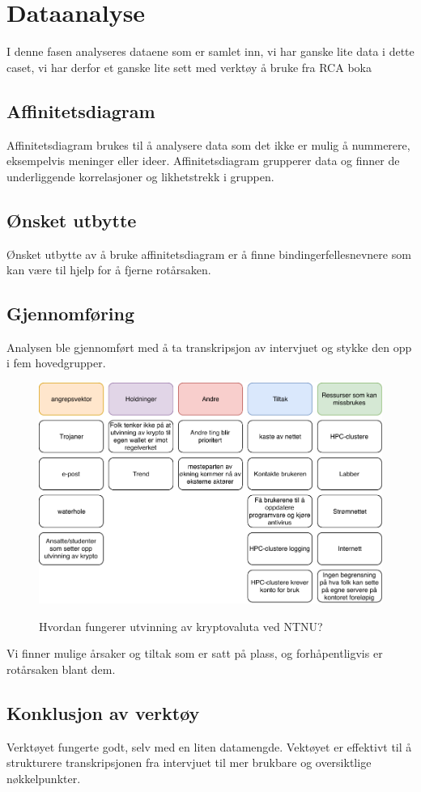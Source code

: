 \chapter{Dataanalyse}
I denne fasen analyseres dataene som er samlet inn, vi har ganske lite data i dette caset, vi har derfor et ganske lite sett med verktøy å bruke fra RCA boka \cite{RCA}

\section{Affinitetsdiagram}
Affinitetsdiagram brukes til å analysere data som det ikke er mulig å nummerere, eksempelvis meninger eller ideer. Affinitetsdiagram grupperer data og finner de underliggende korrelasjoner og likhetstrekk i gruppen.


\section{Ønsket utbytte}
Ønsket utbytte av å bruke affinitetsdiagram er å finne bindinger\/fellesnevnere som kan være til hjelp for å fjerne rotårsaken. 

\section{Gjennomføring }
Analysen ble gjennomført med å ta transkripsjon av intervjuet og stykke den opp i fem hovedgrupper.   

\begin{figure}[H]
    \centering
    \includegraphics[scale=0.6]{case_3/bilder/AD.pdf}
    \label{fig:AD_miner}
    \caption{Hvordan fungerer utvinning av kryptovaluta ved NTNU?}
\end{figure}

Vi finner mulige årsaker og tiltak som er satt på plass, og forhåpentligvis er rotårsaken blant dem. 

\section{Konklusjon av verktøy}
Verktøyet fungerte godt, selv med en liten datamengde. Vektøyet er effektivt til å strukturere transkripsjonen fra intervjuet til mer brukbare og oversiktlige nøkkelpunkter.
